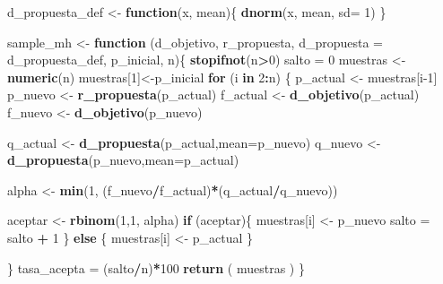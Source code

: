 \documentclass[
]{article}
\newenvironment{Shaded}{\begin{snugshade}}{\end{snugshade}}
\newcommand{\AttributeTok}[1]{\textcolor[rgb]{0.13,0.29,0.53}{#1}}
\newcommand{\ControlFlowTok}[1]{\textcolor[rgb]{0.13,0.29,0.53}{\textbf{#1}}}
\newcommand{\DecValTok}[1]{\textcolor[rgb]{0.00,0.00,0.81}{#1}}
\newcommand{\FunctionTok}[1]{\textcolor[rgb]{0.13,0.29,0.53}{\textbf{#1}}}
\newcommand{\NormalTok}[1]{#1}
\newcommand{\OtherTok}[1]{\textcolor[rgb]{0.56,0.35,0.01}{#1}}
\newcommand{\SpecialCharTok}[1]{\textcolor[rgb]{0.81,0.36,0.00}{\textbf{#1}}}
\begin{document}
\begin{Shaded}
\begin{Highlighting}[]
\NormalTok{d\_propuesta\_def }\OtherTok{\textless{}{-}} \ControlFlowTok{function}\NormalTok{(x, mean)\{}
  \FunctionTok{dnorm}\NormalTok{(x, mean, }\AttributeTok{sd=} \DecValTok{1}\NormalTok{)}
\NormalTok{\}}

\NormalTok{sample\_mh }\OtherTok{\textless{}{-}} \ControlFlowTok{function}\NormalTok{ (d\_objetivo, r\_propuesta, }\AttributeTok{d\_propuesta =}\NormalTok{ d\_propuesta\_def, p\_inicial, n)\{}
  \FunctionTok{stopifnot}\NormalTok{(n}\SpecialCharTok{\textgreater{}}\DecValTok{0}\NormalTok{)}
\NormalTok{  salto }\OtherTok{=} \DecValTok{0}
\NormalTok{  muestras }\OtherTok{\textless{}{-}} \FunctionTok{numeric}\NormalTok{(n)}
\NormalTok{  muestras[}\DecValTok{1}\NormalTok{]}\OtherTok{\textless{}{-}}\NormalTok{p\_inicial}
  \ControlFlowTok{for}\NormalTok{ (i }\ControlFlowTok{in} \DecValTok{2}\SpecialCharTok{:}\NormalTok{n) \{}
\NormalTok{    p\_actual }\OtherTok{\textless{}{-}}\NormalTok{ muestras[i}\DecValTok{{-}1}\NormalTok{]}
\NormalTok{    p\_nuevo }\OtherTok{\textless{}{-}} \FunctionTok{r\_propuesta}\NormalTok{(p\_actual)}
\NormalTok{    f\_actual }\OtherTok{\textless{}{-}} \FunctionTok{d\_objetivo}\NormalTok{(p\_actual)}
\NormalTok{    f\_nuevo }\OtherTok{\textless{}{-}} \FunctionTok{d\_objetivo}\NormalTok{(p\_nuevo)}
    
\NormalTok{    q\_actual }\OtherTok{\textless{}{-}} \FunctionTok{d\_propuesta}\NormalTok{(p\_actual,}\AttributeTok{mean=}\NormalTok{p\_nuevo)}
\NormalTok{    q\_nuevo }\OtherTok{\textless{}{-}} \FunctionTok{d\_propuesta}\NormalTok{(p\_nuevo,}\AttributeTok{mean=}\NormalTok{p\_actual)}
    
\NormalTok{    alpha }\OtherTok{\textless{}{-}} \FunctionTok{min}\NormalTok{(}\DecValTok{1}\NormalTok{, (f\_nuevo}\SpecialCharTok{/}\NormalTok{f\_actual)}\SpecialCharTok{*}\NormalTok{(q\_actual}\SpecialCharTok{/}\NormalTok{q\_nuevo))}
    
\NormalTok{    aceptar }\OtherTok{\textless{}{-}} \FunctionTok{rbinom}\NormalTok{(}\DecValTok{1}\NormalTok{,}\DecValTok{1}\NormalTok{, alpha)}
    \ControlFlowTok{if}\NormalTok{ (aceptar)\{}
\NormalTok{      muestras[i] }\OtherTok{\textless{}{-}}\NormalTok{ p\_nuevo}
\NormalTok{      salto }\OtherTok{=}\NormalTok{ salto }\SpecialCharTok{+} \DecValTok{1}  
\NormalTok{    \} }\ControlFlowTok{else}\NormalTok{ \{}
\NormalTok{      muestras[i] }\OtherTok{\textless{}{-}}\NormalTok{ p\_actual}
\NormalTok{    \}}
    
\NormalTok{  \}}
\NormalTok{  tasa\_acepta }\OtherTok{=}\NormalTok{ (salto}\SpecialCharTok{/}\NormalTok{n)}\SpecialCharTok{*}\DecValTok{100}
  \FunctionTok{return}\NormalTok{ ( muestras ) }
\NormalTok{\}}
\end{Highlighting}
\end{Shaded}
\end{document}
